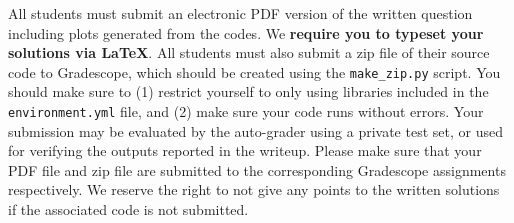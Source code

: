 All students must submit an electronic PDF version of the written question including plots generated from the codes. We
{\bf require you to typeset your solutions via \LaTeX}. 
All students must also submit a zip file of
their source code to Gradescope, which should be created using the
\texttt{make\_zip.py} script. You
should make sure to (1) restrict yourself to only using libraries included in
the
\texttt{environment.yml} file, and (2) make sure your code runs without errors.
Your submission may be evaluated by the
auto-grader using a private test set, or used for verifying the outputs reported in the writeup. Please make sure that your PDF file and zip file are submitted to the corresponding Gradescope assignments respectively. We reserve the right to not give any points to the written solutions if the associated code is not submitted.

\vspace{0.1in}
